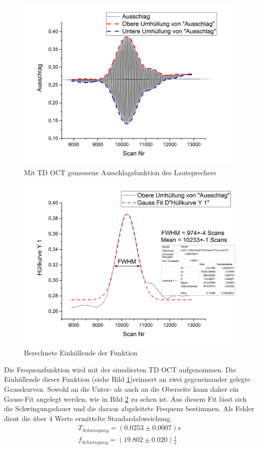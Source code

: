 \documentclass[german, %
parskip=full, %
bibliography=totoc, %
]{scrartcl}
\begin{document}
\begin{figure}[ht]
	\centering
	  \includegraphics[width=\textwidth]{TD_OCT_DATA_Einhullende}
	\caption{Mit TD OCT gemessene Ausschlagsfunktion des Lautsprechers}
	\label{fig:Funktion}
\end{figure}
\begin{figure}[ht]
  \centering
	  \includegraphics[width=\textwidth]{TD_OCT_FINAL}
  \caption{Berechnete Einhüllende der Funktion}
	\label{fig:hull}
\end{figure}

Die Frequenzfunktion wird mit der simulierten TD OCT aufgenommen. Die Einhüllende dieser Funktion (siehe Bild \ref{fig:Funktion})erinnert an zwei gegeneinander gelegte Gausskurven. Sowohl an die Unter- als auch an die Oberseite kann daher ein Gauss-Fit angelegt werden, wie in Bild \ref{fig:hull} zu sehen ist. Aus diesem Fit lässt sich die Schwingungsdauer und die daraus abgeleitete Frequenz bestimmen. Als Fehler dient die über 4 Werte ermittelte Standardabweichung.
\begin{align*}
T_{Schwingung} = (0.0253 \pm 0.0007) s \\
f_{Schwingung} = (19.802 \pm 0.020) \frac{1}{s}
\end{align*}
\end{document}
